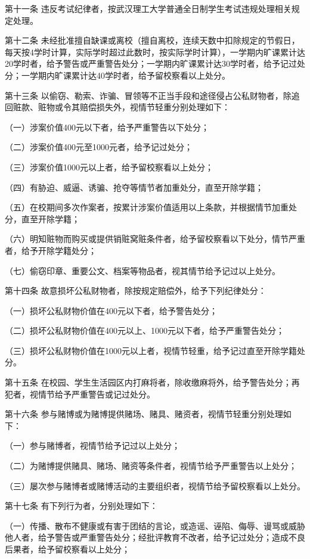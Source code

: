 \documentclass[UTF8,12pt,a4paper]{report}
\begin{document}
第十一条  违反考试纪律者，按武汉理工大学普通全日制学生考试违规处理相关规定处理。

第十二条  未经批准擅自缺课或离校（擅自离校，连续天数中扣除规定的节假日，每天按4学时计算，实际学时超过此数时，按实际学时计算），一学期内旷课累计达20学时者，给予警告或严重警告处分；一学期内旷课累计达30学时者，给予记过处分；一学期内旷课累计达40学时者，给予留校察看以上处分。

第十三条  以偷窃、勒索、诈骗、冒领等不正当手段和途径侵占公私财物者，除追回赃款、赃物或令其赔偿损失外，视情节轻重分别处理如下：

（一）涉案价值400元以下者，给予严重警告以下处分；

（二）涉案价值400元至1000元者，给予记过处分；

（三）涉案价值1000元以上者，给予留校察看以上处分；

（四）有胁迫、威逼、诱骗、抢夺等情节者加重处分，直至开除学籍；

（五）在校期间多次作案者，按累计涉案价值适用以上条款，并根据情节加重处分，直至开除学籍； 

（六）明知赃物而购买或提供销赃窝赃条件者，给予留校察看以下处分，情节严重者，给予开除学籍处分；

（七）偷窃印章、重要公文、档案等物品者，视其情节给予记过以上处分。

第十四条  故意损坏公私财物者，除按规定赔偿外，给予下列纪律处分：

（一）损坏公私财物价值在400元以下者，给予警告处分；

（二）损坏公私财物价值在400元以上、1000元以下者，给予严重警告处分；

（三）损坏公私财物价值在1000元以上者，视情节轻重，给予记过直至开除学籍处分。

第十五条  在校园、学生生活园区内打麻将者，除收缴麻将外，给予警告处分；再犯者，视情节给予严重警告或记过处分。

第十六条  参与赌博或为赌博提供赌场、赌具、赌资者，视情节轻重分别处理如下：

（一）参与赌博者，视情节给予记过以上处分；

（二）为赌博提供赌具、赌场、赌资等条件者，视情节给予严重警告以上处分；

（三）屡次参与赌博者或赌博活动的主要组织者，视情节给予留校察看以上处分。

第十七条  有下列行为者，分别处理如下：

（一）传播、散布不健康或有害于团结的言论，或造谣、诬陷、侮辱、谩骂或威胁他人者，给予警告或严重警告处分；经批评教育不改者，给予记过处分；造成不良后果者，给予留校察看以上处分；
\end{document}
